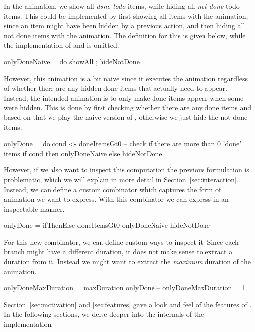 In the  animation, we show all \emph{done todo} items, while hiding all \emph{not done} todo items. This could be implemented by first showing all items with the  animation, since an item might have been hidden by a previous action, and then hiding all not done items with the  animation. The definition for this is given below, while the implementation of  and  is omitted.

\begin{spec}
onlyDoneNaive = do showAll ; hideNotDone
\end{spec}

However, this animation is a bit naive since it executes the  animation regardless of whether there are any hidden done items that actually need to appear. Instead, the intended animation is to only make done items appear when some were hidden. This is done by first checking whether there are any done items and based on that we play the naive version of , otherwise we just hide the not done items.

\begin{spec}
onlyDone = do
  cond <- doneItemsGt0 -- check if there are more than 0 'done' items
  if cond then onlyDoneNaive else hideNotDone
\end{spec}

However, if we also want to inspect this computation the previous formulation is problematic, which we will explain in more detail in Section~\ref{sec:interaction}. Instead, we can define a custom combinator  which captures the form of animation we want to express. With this combinator we can express  in an inspectable manner.

\begin{spec}
onlyDone = ifThenElse doneItemsGt0 onlyDoneNaive hideNotDone
\end{spec}

For this new combinator, we can define custom ways to inspect it. Since each branch might have a different duration, it does not make sense to extract a duration from it. Instead we might want to extract the \emph{maximum} duration of the animation.

\begin{spec}
onlyDoneMaxDuration = maxDuration onlyDone
-- onlyDoneMaxDuration = 1
\end{spec}

Section~\ref{sec:motivation} and \ref{sec:features} gave a look and feel of the features of \dsl{}. In the following sections, we delve deeper into the internals of the implementation.

